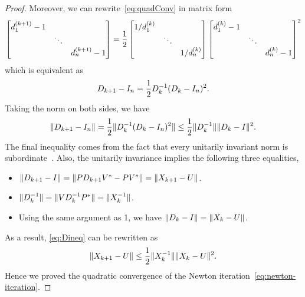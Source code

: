 \documentclass[12pt]{article}
\begin{document}
\begin{proof}
    Moreover, we can rewrite~\eqref{eq:quadConv} in matrix form
    \begin{equation}
        \notag
        \begin{bmatrix}
            d_1^{(k+1)}-1 & & \\
            & \ddots & \\
            & & d_n^{(k+1)}-1
        \end{bmatrix} = 
        \frac{1}{2}
        \begin{bmatrix}
            1/d_1^{(k)} & & \\
            & \ddots & \\
            & & 1/d_n^{(k)}
        \end{bmatrix}
        \begin{bmatrix}
            d_1^{(k)}-1 & & \\
            & \ddots & \\
            & & d_n^{(k)}-1
        \end{bmatrix}^2
    \end{equation}
    which is equivalent as 
    \begin{equation}
        \notag 
        D_{k+1} - I_n = \frac{1}{2} D_k^{-1} (D_k - I_n)^2.
    \end{equation}
    Taking the norm on both sides, we have 
    \begin{equation}
        \label{eq:Dineq} 
        \|{D_{k+1} - I_n}\| = \frac{1}{2} \|{D_k^{-1} (D_k - I_n)^2}\|\leq \frac{1}{2} \|{D_k^{-1}}\|\|{D_k - I}\|^2.
    \end{equation}
    The final inequality comes from the fact that every unitarily invariant norm is subordinate~. Also, the unitarily invariance implies the following three equalities,
    \begin{itemize}
        \item $\|{D_{k+1}- I}\| = \|{PD_{k+1} V^* - PV^*}\| = \|{X_{k+1} - U}\|$. 
        \item $\|{D_k^{-1}}\| = \|{VD_k^{-1} P^*}\| =\|{X_k^{-1}}\|$.
        \item Using the same argument as 1, we have $\|{D_k - I}\| = \|{X_k - U}\|$.
    \end{itemize}
    As a result, \eqref{eq:Dineq} can be rewritten as 
    \begin{equation}\notag
        \|{X_{k+1} - U}\| \leq \frac 12 \|{X_k^{-1}}\|\|{X_k - U}\|^2.
    \end{equation}
    Hence we proved the quadratic convergence of the Newton iteration~\eqref{eq:newton-iteration}.
\end{proof}
\end{document}

